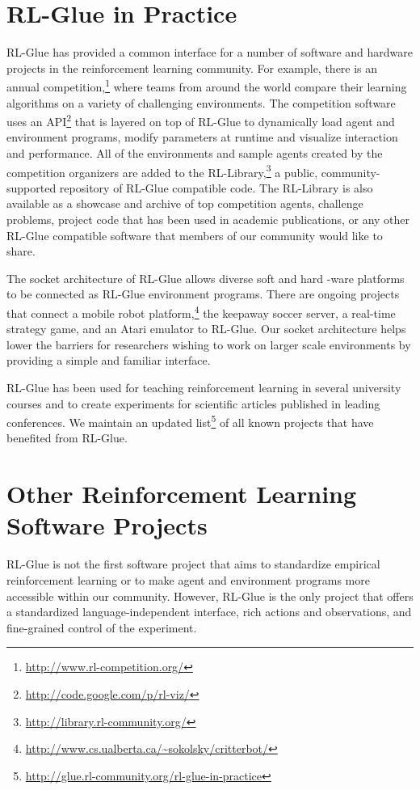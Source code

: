 \documentclass[twoside,11pt]{article}
\begin{document}
\section{RL-Glue in Practice}
RL-Glue has provided a common interface for a number of software and hardware projects in the reinforcement learning community.  For example, there is an annual competition,\footnote{\url{http://www.rl-competition.org/}} where teams from around the world compare their learning algorithms on a variety of challenging environments.  The competition software uses an API\footnote{\url{http://code.google.com/p/rl-viz/}} that is layered on top of RL-Glue to dynamically load agent and environment programs, modify parameters at runtime and visualize interaction and performance.  All of the environments and sample agents created by the competition organizers are added to the RL-Library,\footnote{\url{http://library.rl-community.org/}} a public, community-supported repository of RL-Glue compatible code. The RL-Library is also available as a showcase and archive of top competition agents, challenge problems, project code that has been used in academic publications, or any other RL-Glue compatible software that members of our community would like to share.


The socket architecture of RL-Glue allows diverse soft and hard -ware platforms to be connected as RL-Glue environment programs.  There are ongoing projects that connect a mobile robot platform,\footnote{\url{http://www.cs.ualberta.ca/~sokolsky/critterbot/}} the keepaway soccer server, a real-time strategy game, and an Atari emulator to RL-Glue. Our socket architecture helps lower the barriers for researchers wishing to work on larger scale environments by providing a simple and familiar interface. %

RL-Glue has been used for teaching reinforcement learning in several university courses and to create experiments for scientific articles published in leading conferences. We maintain an updated list\footnote{\url{http://glue.rl-community.org/rl-glue-in-practice}} of all known projects that have benefited from RL-Glue.



\section{Other Reinforcement Learning Software Projects}
RL-Glue is not the first software project that aims to  standardize empirical reinforcement learning or to make agent and environment programs more accessible within our community.  However, RL-Glue is the only project that offers a standardized language-independent interface, rich actions and observations, and fine-grained control of the experiment.
\end{document}
